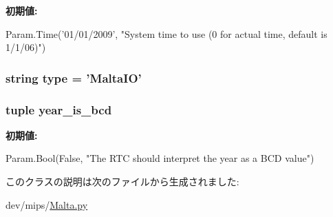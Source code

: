 \label{classMalta_1_1MaltaIO_a429c35172fbcb8b1788bead147e4719b}
{\bfseries 初期値:}
\begin{DoxyCode}
Param.Time('01/01/2009',
        "System time to use (0 for actual time, default is 1/1/06)")
\end{DoxyCode}
\hypertarget{classMalta_1_1MaltaIO_acce15679d830831b0bbe8ebc2a60b2ca}{
\subsubsection[{type}]{\setlength{\rightskip}{0pt plus 5cm}string {\bf type} = '{\bf MaltaIO}'}}
\label{classMalta_1_1MaltaIO_acce15679d830831b0bbe8ebc2a60b2ca}
\hypertarget{classMalta_1_1MaltaIO_aaec21bf266d8a17759fe4f5bf79b06fb}{
\subsubsection[{year\_\-is\_\-bcd}]{\setlength{\rightskip}{0pt plus 5cm}tuple {\bf year\_\-is\_\-bcd}}}
\label{classMalta_1_1MaltaIO_aaec21bf266d8a17759fe4f5bf79b06fb}
{\bfseries 初期値:}
\begin{DoxyCode}
Param.Bool(False,
            "The RTC should interpret the year as a BCD value")
\end{DoxyCode}


このクラスの説明は次のファイルから生成されました:\begin{DoxyCompactItemize}
\item 
dev/mips/\hyperlink{Malta_8py}{Malta.py}\end{DoxyCompactItemize}
